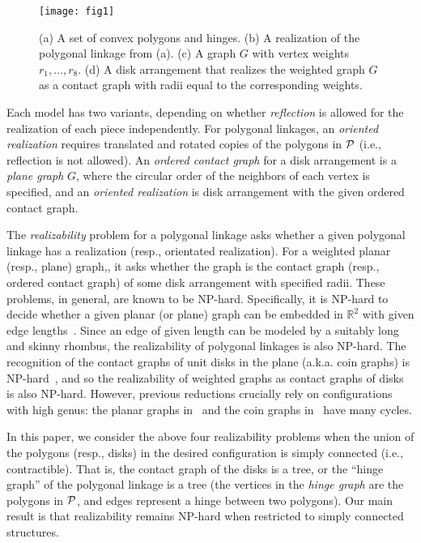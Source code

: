 \documentclass{llncs}
\newcommand{\RR}{\mathbb{R}} %
\newcommand{\PP}{{\cal P}} %
\begin{document}
\begin{figure}[htbp]
  \centering
 \texttt{[image: fig1]}
\caption{\small (a) A set of convex polygons and hinges. (b) A realization of the polygonal linkage from (a).
(c) A graph $G$ with vertex weights $r_1,\ldots , r_8$. (d) A disk arrangement that realizes the weighted graph $G$
 as a contact graph with radii equal to the corresponding weights.}
  \label{fig:1}
\end{figure}

Each model has two variants, depending on whether \emph{reflection} is allowed for the realization of each piece independently. For polygonal linkages, an \emph{oriented realization} requires translated and rotated copies of the polygons in $\PP$ (i.e., reflection is not allowed). An \emph{ordered contact graph} for a disk arrangement is a \emph{plane graph} $G$, where the circular order of the neighbors of each vertex is specified, and an \emph{oriented realization} is disk arrangement with the given ordered contact graph.

The \emph{realizability} problem for a polygonal linkage asks whether a given polygonal linkage has a realization (resp., orientated realization). For a weighted planar (resp., plane) graph,, it asks whether the graph is
the contact graph (resp., ordered contact graph) of some disk arrangement with specified radii. These problems, in general, are known to be NP-hard. Specifically, it is NP-hard to decide whether a given planar (or plane) graph can be embedded in $\RR^2$ with given edge lengths~\cite{CDD+10,EW90}. Since an edge of given length can be modeled by a suitably long and skinny rhombus, the realizability of polygonal linkages is also NP-hard. The recognition of the contact graphs of unit disks in the plane (a.k.a. coin graphs) is NP-hard~\cite{BK98}, and so the realizability of weighted graphs as contact graphs of disks is also NP-hard. However, previous reductions crucially rely on configurations with high genus: the planar graphs in~\cite{CDD+10,EW90} and the coin graphs in~\cite{BK98} have many cycles.

In this paper, we consider the above four realizability problems when the union of the polygons (resp., disks) in the desired configuration is simply connected (i.e., contractible). That is, the contact graph of the disks is a tree, or the ``hinge graph'' of the polygonal linkage is a tree (the vertices in the \emph{hinge graph} are the polygons in $\PP$, and edges represent a hinge between two polygons). Our main result is that realizability remains NP-hard when restricted to simply connected structures.
\end{document}
